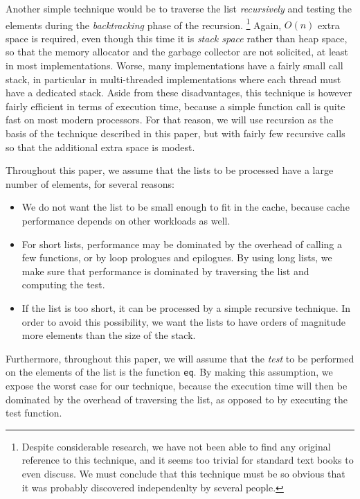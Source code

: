 Another simple technique would be to traverse the list
\emph{recursively} and testing the elements during the
\emph{backtracking} phase of the recursion.%
\footnote{Despite considerable research, we have not been able to find
  any original reference to this technique, and it seems too trivial
  for standard text books to even discuss.  We must conclude that this
  technique must be so obvious that it was probably discovered
  independenlty by several people.}
Again, $O(n)$ extra space
is required, even though this time it is \emph{stack space} rather
than heap space, so that the memory allocator and the garbage
collector are not solicited, at least in most implementations.  Worse,
many implementations have a fairly small call stack, in particular in
multi-threaded implementations where each thread must have a dedicated
stack.  Aside from these disadvantages, this technique is however
fairly efficient in terms of execution time, because a simple function
call is quite fast on most modern processors.  For that reason, we
will use recursion as the basis of the technique described in this
paper, but with fairly few recursive calls so that the additional
extra space is modest.

Throughout this paper, we assume that the lists to be processed have a
large number of elements, for several reasons:

\begin{itemize}
\item We do not want the list to be small enough to fit in the cache,
  because cache performance depends on other workloads as well.
\item For short lists, performance may be dominated by the overhead of
  calling a few functions, or by loop prologues and epilogues.  By
  using long lists, we make sure that performance is dominated by
  traversing the list and computing the test.
\item If the list is too short, it can be processed by a simple
  recursive technique.  In order to avoid this possibility, we want
  the lists to have orders of magnitude more elements than the size of
  the stack.
\end{itemize}

Furthermore, throughout this paper, we will assume that the
\emph{test} to be performed on the elements of the list is the
function \texttt{eq}.  By making this assumption, we expose the worst
case for our technique, because the execution time will then be
dominated by the overhead of traversing the list, as opposed to by
executing the test function.

